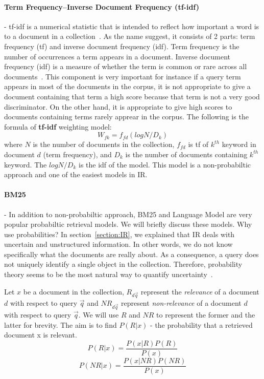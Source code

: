 \paragraph{Term Frequency–Inverse Document Frequency (tf-idf)} - 
tf-idf is a numerical statistic that is intended to reflect how important a word is to a document in a collection~\cite{tfidf}. As the name suggest, it consists
of 2 parts: term frequency (tf) and inverse document frequency (idf). Term frequency is the number of occurrences a term appears in a document.
Inverse document frequency (idf) is a measure of whether the term is common or rare across all documents~\cite{tfidf}.
This component is very important for instance if a query term appears in most of the documents in the corpus, it is not appropriate to give a 
document containing that term a high score because that term is not a very good discriminator. On the other hand, it is appropriate to give high scores to 
documents containing terms rarely apprear in the corpus.
The following is the formula of \textbf{tf-idf} weighting model:
\begin{equation}
W_{fk} = f_{fd}(log N/D_k)
\end{equation}
where $N$ is the number of documents in the collection, $f_{fd}$ is tf of ${k^{th}}$ keyword in document $d$ (term frequency),
and $D_k$ is the number of documents containing ${k^{th}}$ keyword. The $log N/D_k$ is the idf of the model.
This model is a non-probabiltic approach and one of the easiest models in IR.

\paragraph{BM25} - 
In addition to non-probabiltic approach,
BM25 and Language Model are very popular probabiltic retrieval models. We will briefly discuss these models. Why use probabilities? 
In section~\ref{section:IR}, we explained that IR deals with uncertain and unstructured information. In other words, we do not know specifically
what the documents are really about. As a consequence, a query does not uniquely identify a single object in the collection. Therefore, probability theory
seems to be the most natural way to quantify uncertainty~\cite[P. 7]{probModel}.

Let $x$ be a document in the collection, $R_{d\vec{q}}$ represent the \textit{relevance} of a document $d$ with respect to query $\vec{q}$ 
and $NR_{d\vec{q}}$ represent \textit{non-relevance} of a document $d$ with respect to query $\vec{q}$.  We will use $R$ and $NR$ to represent the former and the latter
for brevity. The aim is to find $P(R|x)$ - the probability that a retrieved document x is relevant. 
\begin{equation}
P(R|x) = \frac{P(x|R)P(R)}{P(x)}
\end{equation}
\begin{equation}
P(NR|x) = \frac{P(x|NR)P(NR)}{P(x)}
\end{equation}


